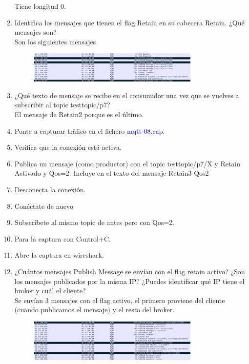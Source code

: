 \documentclass[12pt, a4paper]{report}
\begin{document}
\begin{enumerate}
	Tiene longitud 0.
	\item Identifica los mensajes que tienen el flag Retain en su cabecera Retain. ¿Qué mensajes son?\\
	
	Son los siguientes mensajes
	\begin{figure}[H]
		\centering
		\includegraphics[width=0.8\textwidth]{ej9.12}
	\end{figure}
	\item ¿Qué texto de mensaje se recibe en el consumidor una vez que se vuelves a subscribir al topic
	testtopic/p7?\\
	
	El mensaje de Retain2 porque es el último.
	\item Ponte a capturar tráfico en el fichero \textcolor{blue}{mqtt-08.cap}.
	\item Verifica que la conexión está activa.
	\item Publica un mensaje (como productor) con el topic testtopic/p7/X y Retain Activado y Qos=2.
	Incluye en el texto del mensaje Retain3 Qos2
	\item Desconecta la conexión.
	\item Conéctate de nuevo
	\item Subscríbete al mismo topic de antes pero con Qos=2.
	\item Para la captura con Control+C.
	\item Abre la captura en wireshark.
	\item ¿Cuántos mensajes Publish Message se envían con el flag retain activo? ¿Son los mensajes publicados por la misma IP? ¿Puedes identificar qué IP tiene el broker y cuál el cliente?\\
	
	Se envían 3 mensajes con el flag activo, el primero proviene del cliente (cuando publicamos el mensaje) y el resto del broker.
	\begin{figure}[H]
		\centering
		\includegraphics[width=0.8\textwidth]{ej9.22}
	\end{figure}
\end{enumerate}
\end{document}
